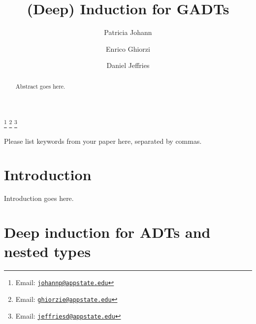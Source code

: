 \documentclass[9pt]{entcs} \usepackage{entcsmacro}
\begin{document}
\begin{frontmatter}
  \title{(Deep) Induction for GADTs}

  \author{Patricia Johann}
  \author{Enrico Ghiorzi}
  \author{Daniel Jeffries}
  \thanks[JohannEmail]{Email: \href{mailto:johannp@appstate.edu} {\texttt{\normalshape johannp@appstate.edu}}}
  \thanks[GhiorziEmail]{Email: \href{mailto:ghiorzie@appstate.edu} {\texttt{\normalshape ghiorzie@appstate.edu}}}
  \thanks[JeffriesEmail]{Email: \href{mailto:jeffriesd@appstate.edu} {\texttt{\normalshape jeffriesd@appstate.edu}}}
  \address{Department of Computer Science\\ Appalachian State University}

\begin{abstract} 
  Abstract goes here.
\end{abstract}

\begin{keyword}
  Please list keywords from your paper here, separated by commas.
\end{keyword}

\end{frontmatter}



\section{Introduction}\label{sec:intro}

Introduction goes here.



\section{Deep induction for ADTs and nested types}

\end{document}
